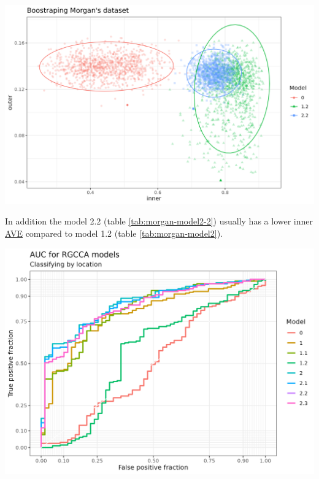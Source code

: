\documentclass[
  12pt,
  a4paper,
  twoside,
  openright]{book}
\let\origfigure\figure
\let\endorigfigure\endfigure
\renewenvironment{figure}[1][2] {
    \expandafter\origfigure\expandafter[!htbp]
} {
    \endorigfigure
}
\begin{document}
\begin{figure}
\includegraphics[width=1\linewidth]{images/morgan_bootstrap} \caption[AVE scores of bootstrapped models from Morgan dataset.]{AVE scores of bootstrapped models from Morgan dataset. Inner and outer AVE scores of the bootstrapped models 0, 1.2 and 2.2 on the Morgan dataset. Model 0 does not have sample data. Model 1.2 has microbiome, transcriptome and sample data in a single block and model 2.2 has microbiome, transcriptome and the sample data split in several blocks. Model 2.2 shows less variance than all models but lower inner values than model 1.2. Each point represents a bootstrapped sample (colored by model used). The dispersion is shown by the ellipses.}\label{fig:morgan-bootstrap}
\end{figure}

In addition the model 2.2 (table \ref{tab:morgan-model2-2}) usually has a lower inner \protect\hyperlink{acronyms_AVE}{AVE} compared to model 1.2 (table \ref{tab:morgan-model2}).

\begin{figure}
\includegraphics[width=1\linewidth]{images/morgan-auc} \caption[AUC of the RGCCA models in the Morgan dataset]{AUC of the RGCCA models in the Morgan dataset. The classification of the localization of the sample according to the first component of the gene expression of the models generated with RGCCA on the Morgan dataset.}\label{fig:morgan-auc-plot}
\end{figure}
\end{document}
